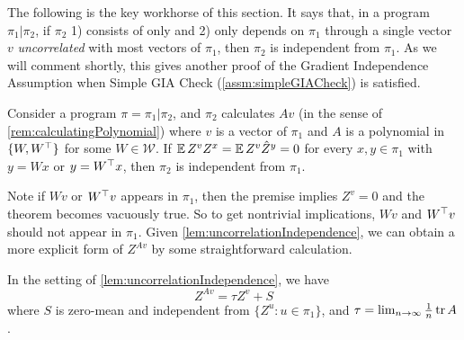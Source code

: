 \documentclass[main.tex]{subfiles}
\begin{document}
The following is the key workhorse of this section. It says that, in a program $\pi_{1}|\pi_{2}$, if $\pi_{2}$ 1) consists of only  and 2) only depends on $\pi_{1}$ through a single vector $v$ \emph{uncorrelated} with most vectors of $\pi_{1}$, then $\pi_{2}$ is independent from $\pi_{1}$. As we will comment shortly, this gives another proof of the Gradient Independence Assumption when Simple GIA Check (\cref{assm:simpleGIACheck}) is satisfied.

\begin{lemma}
\label{lem:uncorrelationIndependence}Consider a \netsort{} program $\pi=\pi_{1}|\pi_{2}$, and $\pi_{2}$ calculates $Av$ (in the sense of \cref{rem:calculatingPolynomial}) where $v$ is a vector of $\pi_{1}$ and $A$ is a polynomial in $\{W,W^{\top}\}$ for some $W\in\mathcal{W}$. If $\operatorname*{\mathbb{E}} Z^{v}Z^{x}=\operatorname*{\mathbb{E}} Z^{v}\hat{Z}^{y}=0$ for every $x,y\in\pi_{1}$ with $y=Wx$ or $y=W^{\top}x$, then $\pi_{2}$ is independent from $\pi_1$.
\end{lemma}

Note if $Wv$ or $W^{\top}v$ appears in $\pi_{1}$, then the premise implies $Z^{v}=0$ and the theorem becomes vacuously true. So to get nontrivial implications, $Wv$ and $W^{\top}v$ should not appear in $\pi_{1}$.
Given \cref{lem:uncorrelationIndependence}, we can obtain a more explicit form of $Z^{Av}$ by some straightforward calculation.
\begin{lemma}
\label{lem:uncorrelatedDecomp}In the setting of \cref{lem:uncorrelationIndependence}, we have
\[
Z^{Av}=\tau Z^{v}+S
\]
where $S$ is zero-mean and independent from $\{Z^{u}:u\in\pi_{1}\}$, and $\tau=\lim_{n\to\infty}\frac{1}{n}\operatorname{tr} A$.
\end{lemma}
\end{document}
